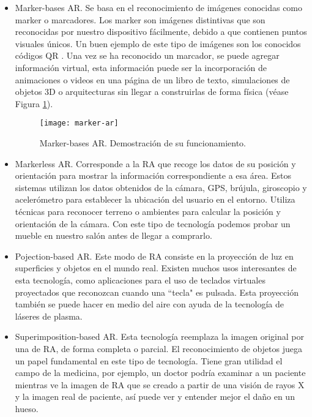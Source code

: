 \begin{itemize}
    \item 
    Marker-bases AR. Se basa en el reconocimiento de imágenes conocidas como marker o marcadores. Los marker son imágenes distintivas que son reconocidas por nuestro dispositivo fácilmente, debido a que contienen puntos visuales únicos. Un buen ejemplo de este tipo de imágenes son los conocidos códigos QR \cite{URL::CodigoQR}. Una vez se ha reconocido un marcador, se puede agregar información virtual, esta información puede ser la incorporación de animaciones o videos en una página de un libro de texto, simulaciones de objetos 3D o arquitecturas sin llegar a construirlas de forma física (véase Figura \ref{fig:markerAR}).
    \begin{figure}[h]
        \centering
        \texttt{[image: marker-ar]}
        \caption{Marker-bases AR. Demostración de su funcionamiento.}
        \label{fig:markerAR}
    \end{figure}

    \bigskip
    \bigskip

    \item Markerless AR. Corresponde a la RA que recoge los datos de su posición y orientación para mostrar la información correspondiente a esa área. Estos sistemas utilizan los datos obtenidos de la cámara, GPS, brújula, giroscopio y acelerómetro para establecer la ubicación del usuario en el entorno. Utiliza técnicas para reconocer terreno o ambientes para calcular la posición y orientación de la cámara. Con este tipo de tecnología podemos probar un mueble en nuestro salón antes de llegar a comprarlo.

 
    \item Pojection-based AR. Este modo de RA consiste en la proyección de luz en superficies y objetos en el mundo real. Existen muchos usos interesantes de esta tecnología, como aplicaciones para el uso de teclados virtuales proyectados que reconozcan cuando una ``tecla" es pulsada. Esta proyección también se puede hacer en medio del aire con ayuda de la tecnología de láseres de plasma.

    \item Superimposition-based AR. Esta tecnología reemplaza la imagen original por una de RA, de forma completa o parcial. El reconocimiento de objetos juega un papel fundamental en este tipo de tecnología. Tiene gran utilidad el campo de la medicina, por ejemplo, un doctor podría examinar a un paciente mientras ve la imagen de RA que se creado a partir de una visión de rayos X y la imagen real de paciente, así puede ver y entender mejor el daño en un hueso.
\end{itemize} 


